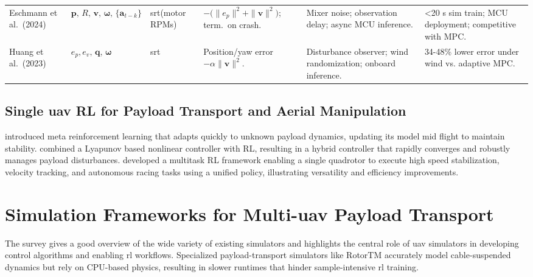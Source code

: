 \begin{table*}[!b]
\begin{tabular}{p{2.0cm}<{\raggedright} p{2.5cm}<{\raggedright} p{2.0cm}<{\raggedright} p{3.0cm}<{\raggedright} p{2.8cm}<{\raggedright} p{2.7cm}<{\raggedright}}
Eschmann et al.\ (2024) \cite{eschmann_learning_2024} & $\mathbf{p},\,R,\,\mathbf{v},\,\boldsymbol{\omega},\,\{\mathbf{a}_{t-k}\}$ & \gls{srt}(motor RPMs) & { $-\bigl(\|e_p\|^2 + \|\mathbf{v}\|^2\bigr)$; term.\ on crash.} & { Mixer noise; observation delay; async MCU inference.} & { <20 s sim train; MCU deployment; competitive with MPC.} \\[1ex]

Huang et al.\ (2023) \cite{huang_quadswarm_2023} & $e_p,e_v,\,\mathbf{q},\,\boldsymbol{\omega}$ & \gls{srt}& { Position/yaw error $- \alpha\|\mathbf{v}\|^2$.} & { Disturbance observer; wind randomization; onboard inference.} & { 34-48\% lower error under wind vs. adaptive MPC.} \\
\hline
\end{tabular}
\end{table*}

\subsection{Single \gls{uav} RL for Payload Transport and Aerial Manipulation}
\cite{belkhale_model-based_2021} introduced meta reinforcement learning that adapts quickly to unknown payload dynamics, updating its model mid flight to maintain stability. \cite{hua_new_2022} combined a Lyapunov based nonlinear controller with RL, resulting in a hybrid controller that rapidly converges and robustly manages payload disturbances. \cite{xing_multi-task_2024} developed a multitask RL framework enabling a single quadrotor to execute high speed stabilization, velocity tracking, and autonomous racing tasks using a unified policy, illustrating versatility and efficiency improvements.

\section{Simulation Frameworks for Multi-\gls{uav} Payload Transport}

The survey \cite{Dimmig2023SurveyOS} gives a good overview of the wide variety of existing simulators and highlights the central role of \gls{uav} simulators in developing control algorithms and enabling \gls{rl} workflows. Specialized payload-transport simulators like RotorTM \cite{Li2022RotorTMAF} accurately model cable-suspended dynamics but rely on CPU-based physics, resulting in slower runtimes that hinder sample-intensive \gls{rl} training.

